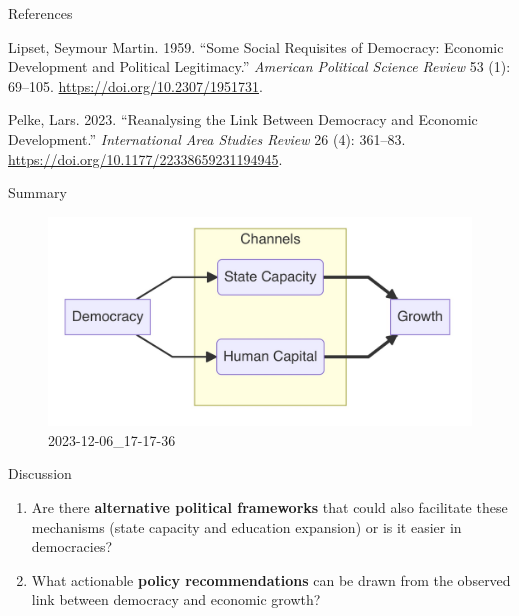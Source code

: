 \documentclass[
  ignorenonframetext,
]{beamer}
\providecommand{\tightlist}{%
  \setlength{\itemsep}{0pt}\setlength{\parskip}{0pt}}\usepackage{longtable,booktabs,array}
\newlength{\cslhangindent}
\newlength{\cslentryspacingunit} %
\newenvironment{CSLReferences}[2] %
 {%
  \setlength{\parindent}{0pt}
  \ifodd #1
  \let\oldpar\par
  \def\par{\hangindent=\cslhangindent\oldpar}
  \fi
  \setlength{\parskip}{#2\cslentryspacingunit}
 }%
 {}
\begin{document}
\begin{frame}{References}
\begin{CSLReferences}{1}{0}
\leavevmode{}%
Lipset, Seymour Martin. 1959. {``Some {Social Requisites} of
{Democracy}: {Economic Development} and {Political Legitimacy}.''}
\emph{American Political Science Review} 53 (1): 69--105.
\url{https://doi.org/10.2307/1951731}.

\leavevmode{}%
Pelke, Lars. 2023. {``Reanalysing the Link Between Democracy and
Economic Development.''} \emph{International Area Studies Review} 26
(4): 361--83. \url{https://doi.org/10.1177/22338659231194945}.

\end{CSLReferences}

\normalsize
\end{frame}

\begin{frame}{Summary}
\protect\hypertarget{summary}{}
\begin{figure}

{\centering \includegraphics{../images/2023-12-06_17-17-36.jpg}

}

\caption{2023-12-06\_17-17-36}

\end{figure}
\end{frame}

\begin{frame}{Discussion}
\protect\hypertarget{discussion}{}
\begin{enumerate}
\tightlist
\item
  Are there \textbf{alternative political frameworks} that could also
  facilitate these mechanisms (state capacity and education expansion)
  or is it easier in democracies?
\item
  What actionable \textbf{policy recommendations} can be drawn from the
  observed link between democracy and economic growth?
\end{enumerate}
\end{frame}
\end{document}
